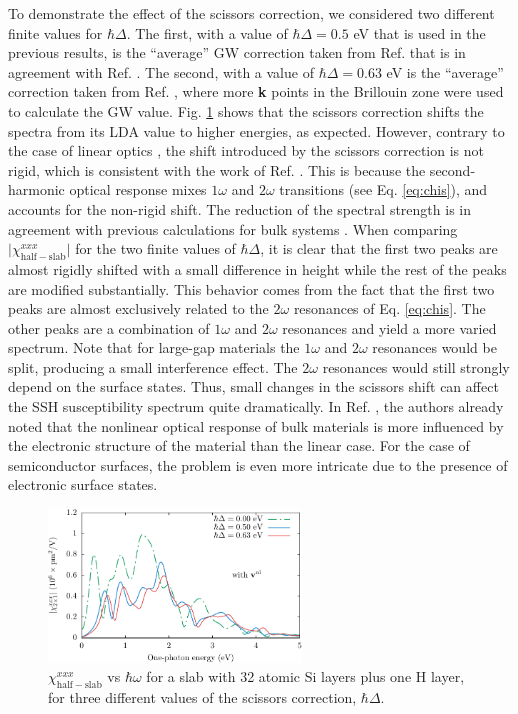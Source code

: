 To demonstrate the effect of the scissors correction, we considered two different
finite values for $\hbar\Delta$. The first, with a value of $\hbar\Delta=0.5$ eV
that is used in the previous results, is the ``average'' GW correction taken
from Ref. \cite{rohlfingPRB95} that is in agreement with Ref.
\cite{garciaCPC01}. The second, with a value of $\hbar\Delta=0.63$ eV is the
``average'' correction taken from Ref. \cite{asahiPRB00}, where more \textbf{k}
points in the Brillouin zone were used to calculate the GW value. Fig.
\ref{fig:scissors} shows that the scissors correction shifts the spectra from
its LDA value to higher energies, as expected. However, contrary to the case of
linear optics \cite{cabellosPRB09}, the shift introduced by the scissors
correction is not rigid, which is consistent with the work of Ref.
\cite{nastosPRB05}. This is because the second-harmonic optical response mixes
$1\omega$ and $2\omega$ transitions (see Eq. \eqref{eq:chis}), and accounts for
the non-rigid shift. The reduction of the spectral strength is in agreement with
previous calculations for bulk systems \cite{nastosPRB05, luppiPRB10,
leitsmannPRB05}. When comparing $\vert\chi^{xxx}_{\mathrm{half-slab}}\vert$ for
the two finite values of $\hbar\Delta$, it is clear that the first two peaks are
almost rigidly shifted with a small difference in height while the rest of the
peaks are modified substantially. This behavior comes from the fact that the
first two peaks are almost exclusively related to the $2\omega$ resonances of
Eq. \eqref{eq:chis}. The other peaks are a combination of $1\omega$ and
$2\omega$ resonances and yield a more varied spectrum. Note that for large-gap
materials the $1\omega$ and $2\omega$ resonances would be split, producing a
small interference effect. The $2\omega$ resonances would still strongly depend
on the surface states. Thus, small changes in the scissors shift can affect the
SSH susceptibility spectrum quite dramatically. In Ref. \cite{adolphPRB00}, the
authors already noted that the nonlinear optical response of bulk materials is
more influenced by the electronic structure of the material than the linear
case. For the case of semiconductor surfaces, the problem is even more intricate
due to the presence of electronic surface states.

\begin{figure}[t]
\centering 
\includegraphics[width=0.6\textwidth]{content/figures/fig-Si2x1-scissors}
\caption[$\chi^{xxx}_{\mathrm{half-slab}}$ with three different values of the 
scissors correction.]
{$\chi^{xxx}_{\mathrm{half-slab}}$ vs $\hbar\omega$ for a slab with 32
atomic Si layers plus one H layer, for three different values of the scissors
correction, $\hbar\Delta$.
\label{fig:scissors}} 
\end{figure}

